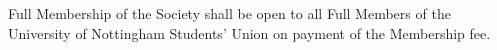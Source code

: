  Full Membership of the Society shall be open to all Full Members of the University of Nottingham Students' Union on payment of the Membership fee.\ \\